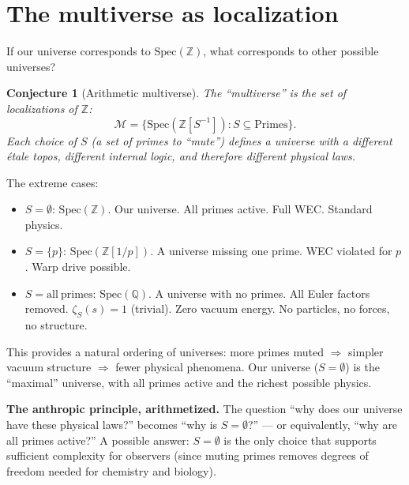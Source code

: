 \documentclass[11pt,a4paper]{article}
\newtheorem{conjecture}[theorem]{Conjecture}
\newcommand{\Spec}{\mathrm{Spec}}
\newcommand{\Zp}{\mathbb{Z}[1/p]}
\begin{document}
\section{The multiverse as localization}
\label{sec:multiverse}

If our universe corresponds to $\Spec(\mathbb{Z})$, what
corresponds to other possible universes?

\begin{conjecture}[Arithmetic multiverse]
\label{conj:multiverse}
The ``multiverse'' is the set of localizations of $\mathbb{Z}$:
\begin{equation}
  \mathcal{M} = \{\Spec(\mathbb{Z}[S^{-1}]) : S \subseteq \mathrm{Primes}\}.
\end{equation}
Each choice of $S$ (a set of primes to ``mute'') defines a
universe with a different \'etale topos, different internal logic,
and therefore different physical laws.
\end{conjecture}

The extreme cases:
\begin{itemize}
\item $S = \emptyset$: $\Spec(\mathbb{Z})$. Our universe. All
  primes active. Full WEC. Standard physics.
\item $S = \{p\}$: $\Spec(\Zp)$. A universe missing one prime.
  WEC violated for $p$. Warp drive possible.
\item $S = \mathrm{all\ primes}$: $\Spec(\mathbb{Q})$. A universe
  with no primes. All Euler factors removed.
  $\zeta_{S}(s) = 1$ (trivial). Zero vacuum energy.
  No particles, no forces, no structure.
\end{itemize}

This provides a natural ordering of universes:
more primes muted $\Rightarrow$ simpler vacuum structure
$\Rightarrow$ fewer physical phenomena.
Our universe ($S = \emptyset$) is the ``maximal'' universe,
with all primes active and the richest possible physics.

\textbf{The anthropic principle, arithmetized.}
The question ``why does our universe have these physical laws?''
becomes ``why is $S = \emptyset$?'' --- or equivalently,
``why are all primes active?''
A possible answer: $S = \emptyset$ is the only choice that
supports sufficient complexity for observers (since muting primes
removes degrees of freedom needed for chemistry and biology).

\end{document}
